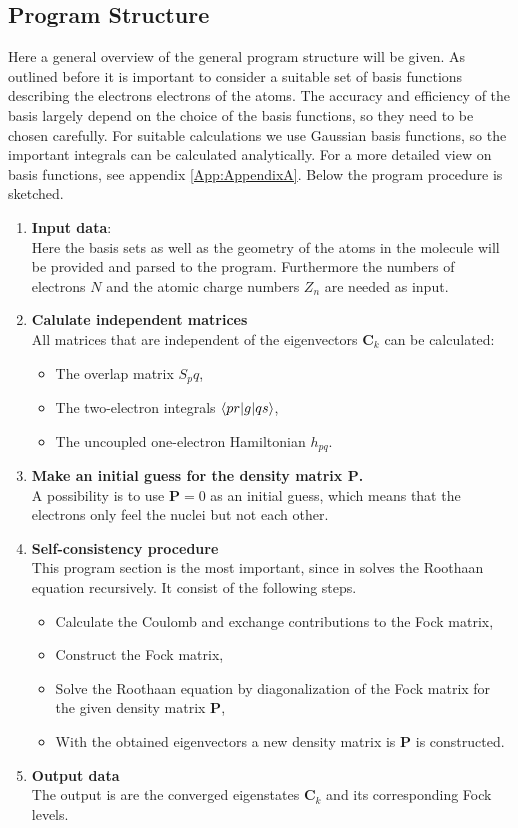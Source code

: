 \documentclass[twoside,        %
			   12pt,			%
               BCOR10mm,       %
               ngerman,english  %
               ]{scrartcl}
\begin{document}
    
\subsection{Program Structure}
Here a general overview of the general program structure will be given.
As outlined before it is important to consider a suitable set of basis functions describing the electrons electrons of the atoms. The accuracy and efficiency of the basis largely depend on the choice of the basis functions, so they need to be chosen carefully. For suitable calculations we use Gaussian basis functions, so the important integrals can be calculated analytically. For a more detailed view on basis functions, see appendix \ref{App:AppendixA}.
Below the program procedure is sketched.

\begin{enumerate}
	\item \textbf{Input data}:\\
	Here the basis sets as well as the geometry of the atoms in the molecule will be provided and parsed to the program. Furthermore the numbers of electrons $N$ and the atomic charge numbers $Z_n$ are needed as input.
	\item \textbf{Calulate independent matrices}\\
	All matrices that are independent of the eigenvectors $\mathbf{C}_k$ can be calculated:
	\begin{itemize}
		\item The overlap matrix $S_pq$,
		\item The two-electron integrals $\braket{pr|g|qs}$,
		\item The uncoupled one-electron Hamiltonian $h_{pq}$.
	\end{itemize}
	\item \textbf{Make an initial guess for the density matrix $\mathbf{P}$.}\\
	A possibility is to use $\mathbf{P} = 0$ as an initial guess, which means that the electrons only feel the nuclei but not each other.
	\item \textbf{Self-consistency procedure}\\
	This program section is the most important, since in solves the Roothaan equation recursively. It consist of the following steps.
	\begin{itemize}
		\item Calculate the Coulomb and exchange contributions to the Fock matrix,
		\item Construct the Fock matrix,
		\item Solve the Roothaan equation by diagonalization of the Fock matrix for the given density matrix $\mathbf{P}$,
		\item With the obtained eigenvectors a new density matrix is $\mathbf{P}$ is constructed.
	\end{itemize}
	\item \textbf{Output data}\\
	The output is are the converged eigenstates $\mathbf{C}_k$ and its corresponding Fock levels.
\end{enumerate}
\end{document}
